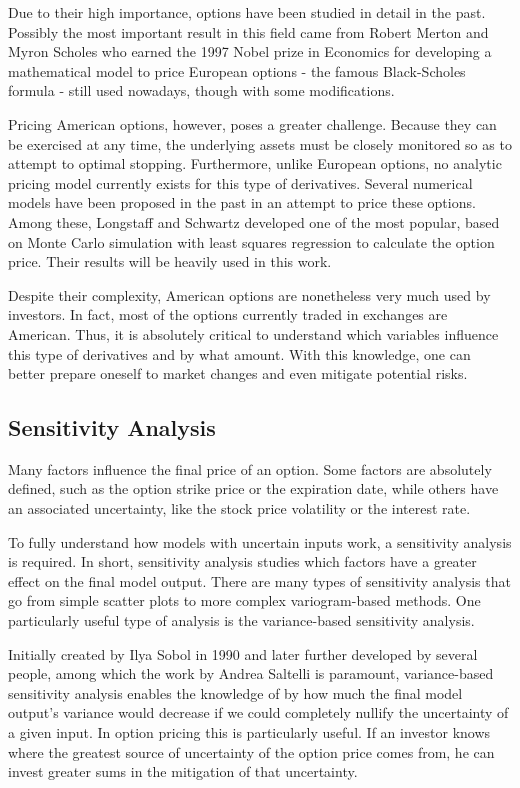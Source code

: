 \documentclass[a4paper,prd,twocolumn,nofootinbib,superscriptaddress,floatfix]{revtex4}
\begin{document}
Due to their high importance, options have been studied in detail in the past.
Possibly the most important result in this field came from Robert Merton and Myron Scholes who earned the 1997 Nobel prize in Economics for developing a mathematical model to price European options - the famous Black-Scholes formula - still used nowadays, though with some modifications.

Pricing American options, however, poses a greater challenge. Because they can be exercised at any time, the underlying assets must be closely monitored so as to attempt to optimal stopping.
Furthermore, unlike European options, no analytic pricing model currently exists for this type of derivatives. Several numerical models have been proposed in the past in an attempt to price these options. Among these, Longstaff and Schwartz developed one of the most popular, based on Monte Carlo simulation with least squares regression to calculate the option price. Their results will be heavily used in this work.

Despite their complexity, American options are nonetheless very much used by investors. In fact, most of the options currently traded in exchanges are American. Thus, it is absolutely critical to understand which variables influence this type of derivatives and by what amount. With this knowledge, one can better prepare oneself to market changes and even mitigate potential risks.

\subsection{Sensitivity Analysis}
Many factors influence the final price of an option.
Some factors are absolutely defined, such as the option strike price or the expiration date, while others have an associated uncertainty, like the stock price volatility or the interest rate.

To fully understand how models with uncertain inputs work, a sensitivity analysis is required. In short, sensitivity analysis studies which factors have a greater effect on the final model output.
There are many types of sensitivity analysis that go from simple scatter plots to more complex variogram-based methods. One particularly useful type of analysis is the variance-based sensitivity analysis.

Initially created by Ilya Sobol in 1990 and later further developed by several people, among which the work by Andrea Saltelli is paramount, variance-based sensitivity analysis enables the knowledge of by how much the final model output's variance would decrease if we could completely nullify the uncertainty of a given input.
In option pricing this is particularly useful. If an investor knows where the greatest source of uncertainty of the option price comes from, he can invest greater sums in the mitigation of that uncertainty.
\end{document}

